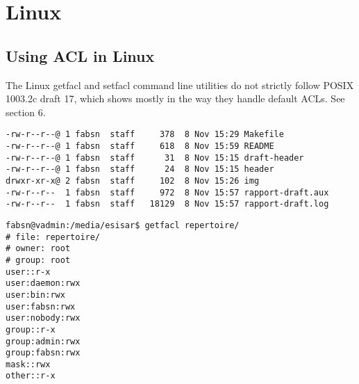 

\section{Linux}









\subsection*{Using ACL in Linux}
 

The Linux getfacl and setfacl command line utilities do not strictly follow POSIX 1003.2c draft 17, which shows mostly in the way they handle default ACLs. See section 6.


\begin{verbatim}
-rw-r--r--@ 1 fabsn  staff     378  8 Nov 15:29 Makefile
-rw-r--r--@ 1 fabsn  staff     618  8 Nov 15:59 README
-rw-r--r--@ 1 fabsn  staff      31  8 Nov 15:15 draft-header
-rw-r--r--@ 1 fabsn  staff      24  8 Nov 15:15 header
drwxr-xr-x@ 2 fabsn  staff     102  8 Nov 15:26 img
-rw-r--r--  1 fabsn  staff     972  8 Nov 15:57 rapport-draft.aux
-rw-r--r--  1 fabsn  staff   18129  8 Nov 15:57 rapport-draft.log
\end{verbatim}

\begin{verbatim}
fabsn@vadmin:/media/esisar$ getfacl repertoire/
# file: repertoire/
# owner: root
# group: root
user::r-x
user:daemon:rwx
user:bin:rwx
user:fabsn:rwx
user:nobody:rwx
group::r-x
group:admin:rwx
group:fabsn:rwx
mask::rwx
other::r-x	
\end{verbatim}

